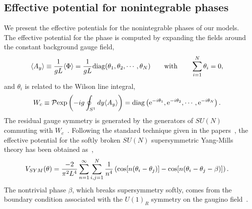 \documentclass[a4paper,12pt]{article}
\begin{document}
\subsection{Effective potential for nonintegrable phases}
We present the effective potentials for the nonintegrable phases 
of our models. The effective potential for the 
phase is computed by expanding the fields around the constant 
background gauge field,
\begin{equation}
\langle A_y \rangle\equiv {1\over{gL}}\langle \Phi \rangle={1\over {gL}}
{\rm diag}(\theta_1, \theta_2,\cdots, \theta_{N})\qquad {\rm with}\qquad
\sum_{i=1}^N\theta_i=0,
\label{background}
\end{equation} 
and $\theta_i$ is related to the Wilson line integral,
\begin{equation}
W_c\equiv {\cal P}{\rm exp}\left({-ig \oint_{S^1}dy \langle A_y \rangle}\right)=
{\rm diag}\left({\rm e}^{-i\theta_1}, {\rm e}^{-i\theta_2}, \cdots, {\rm e}^{-i\theta_N}
\right).
\end{equation}
The residual gauge symmetry is generated by the 
generators of $SU(N)$ commuting with $W_c$~\cite{hosotanib}. 
Following the standard technique given in the 
papers~\cite{hosotani, hosotanib}, 
the effective potential for the softly broken $SU(N)$ supersymmetric 
Yang-Mills theory has been obtained as~\cite{takenaga},
\begin{equation}
V_{SYM}(\theta)={{-2}\over {\pi^2L^4}}
\sum_{n=1}^{\infty}\sum_{i,j=1}^{N}{1\over n^4}
\left(\cos[n(\theta_i-\theta_j)]
-\cos[n(\theta_i-\theta_j-\beta)]\right).
\label{symeff}
\end{equation}
The nontrivial phase $\beta$, which breaks supersymmetry softly, comes from
the boundary condition associated with the $U(1)_R$ symmetry on the gaugino
field~\cite{takenaga, takenagac}.
\end{document}
